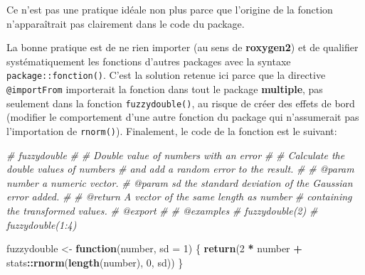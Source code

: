 \documentclass[
  12pt,
  french,
  a4paper,
  extrafontsizes,onecolumn,openright
  ]{memoir}
\newenvironment{Shaded}{\begin{snugshade}}{\end{snugshade}}
\newcommand{\AttributeTok}[1]{\textcolor[rgb]{0.13,0.29,0.53}{#1}}
\newcommand{\CommentTok}[1]{\textcolor[rgb]{0.56,0.35,0.01}{\textit{#1}}}
\newcommand{\ControlFlowTok}[1]{\textcolor[rgb]{0.13,0.29,0.53}{\textbf{#1}}}
\newcommand{\DecValTok}[1]{\textcolor[rgb]{0.00,0.00,0.81}{#1}}
\newcommand{\FunctionTok}[1]{\textcolor[rgb]{0.13,0.29,0.53}{\textbf{#1}}}
\newcommand{\NormalTok}[1]{#1}
\newcommand{\OtherTok}[1]{\textcolor[rgb]{0.56,0.35,0.01}{#1}}
\newcommand{\SpecialCharTok}[1]{\textcolor[rgb]{0.81,0.36,0.00}{\textbf{#1}}}
\begin{document}
\normalsize

Ce n'est pas une pratique idéale non plus parce que l'origine de la fonction n'apparaîtrait pas clairement dans le code du package.

La bonne pratique est de ne rien importer (au sens de \textbf{roxygen2}) et de qualifier systématiquement les fonctions d'autres packages avec la syntaxe \texttt{package::fonction()}.
C'est la solution retenue ici parce que la directive \texttt{@importFrom} importerait la fonction dans tout le package \textbf{multiple}, pas seulement dans la fonction \texttt{fuzzydouble()}, au risque de créer des effets de bord (modifier le comportement d'une autre fonction du package qui n'assumerait pas l'importation de \texttt{rnorm()}).
Finalement, le code de la fonction est le suivant:

\scriptsize

\begin{Shaded}
\begin{Highlighting}[]
\CommentTok{\#\textquotesingle{} fuzzydouble}
\CommentTok{\#\textquotesingle{} }
\CommentTok{\#\textquotesingle{} Double value of numbers with an error}
\CommentTok{\#\textquotesingle{} }
\CommentTok{\#\textquotesingle{} Calculate the double values of numbers }
\CommentTok{\#\textquotesingle{} and add a random error to the result.}
\CommentTok{\#\textquotesingle{}}
\CommentTok{\#\textquotesingle{} @param number a numeric vector.}
\CommentTok{\#\textquotesingle{} @param sd the standard deviation of the Gaussian error added.}
\CommentTok{\#\textquotesingle{}}
\CommentTok{\#\textquotesingle{} @return A vector of the same length as \textasciigrave{}number\textasciigrave{}}
\CommentTok{\#\textquotesingle{}  containing the transformed values.}
\CommentTok{\#\textquotesingle{} @export}
\CommentTok{\#\textquotesingle{}}
\CommentTok{\#\textquotesingle{} @examples}
\CommentTok{\#\textquotesingle{} fuzzydouble(2)}
\CommentTok{\#\textquotesingle{} fuzzydouble(1:4)}

\NormalTok{fuzzydouble }\OtherTok{\textless{}{-}} \ControlFlowTok{function}\NormalTok{(number, }\AttributeTok{sd =} \DecValTok{1}\NormalTok{) \{}
  \FunctionTok{return}\NormalTok{(}\DecValTok{2} \SpecialCharTok{*}\NormalTok{ number }\SpecialCharTok{+}\NormalTok{ stats}\SpecialCharTok{::}\FunctionTok{rnorm}\NormalTok{(}\FunctionTok{length}\NormalTok{(number), }\DecValTok{0}\NormalTok{, sd))}
\NormalTok{\}}
\end{Highlighting}
\end{Shaded}

\normalsize
\end{document}
